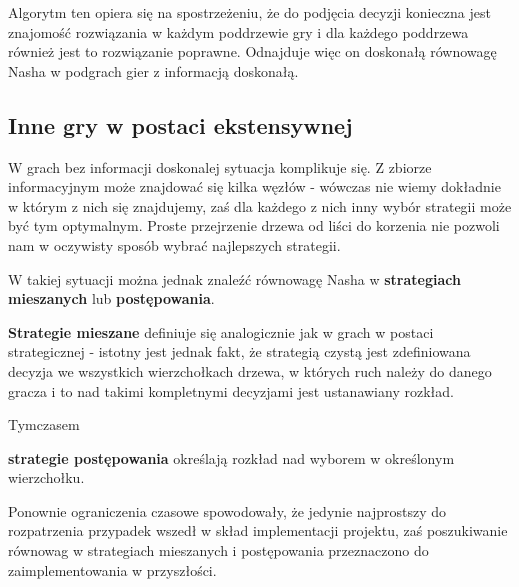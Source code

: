 \documentclass[polish]{standalone}
\begin{document}
Algorytm ten opiera się na spostrzeżeniu, że do podjęcia decyzji konieczna jest znajomość rozwiązania w każdym poddrzewie
gry i dla każdego poddrzewa również jest to rozwiązanie poprawne. Odnajduje więc on doskonałą równowagę Nasha w podgrach
gier z informacją doskonałą.

\subsection{Inne gry w postaci ekstensywnej}

W grach bez informacji doskonalej sytuacja komplikuje się. Z zbiorze informacyjnym może znajdować się kilka węzłów -
wówczas nie wiemy dokładnie w którym z nich się znajdujemy, zaś dla każdego z nich inny wybór strategii może być tym
optymalnym. Proste przejrzenie drzewa od liści do korzenia nie pozwoli nam w oczywisty sposób wybrać najlepszych
strategii.

W takiej sytuacji można jednak znaleźć równowagę Nasha w \textbf{strategiach mieszanych} lub \textbf{postępowania}.

\begin{definition}
\textbf{Strategie mieszane} definiuje się analogicznie jak w grach w postaci strategicznej - istotny jest jednak fakt,
że strategią czystą jest zdefiniowana decyzja we wszystkich wierzchołkach drzewa, w których ruch należy do danego gracza
i to nad takimi kompletnymi decyzjami jest ustanawiany rozkład.
\end{definition}

Tymczasem
\begin{definition}
\textbf{strategie postępowania} określają rozkład nad wyborem w określonym wierzchołku.
\end{definition}

Ponownie ograniczenia czasowe spowodowały, że jedynie najprostszy do rozpatrzenia przypadek wszedł w skład implementacji
projektu, zaś poszukiwanie równowag w strategiach mieszanych i postępowania przeznaczono do zaimplementowania
w przyszłości.
\end{document}
